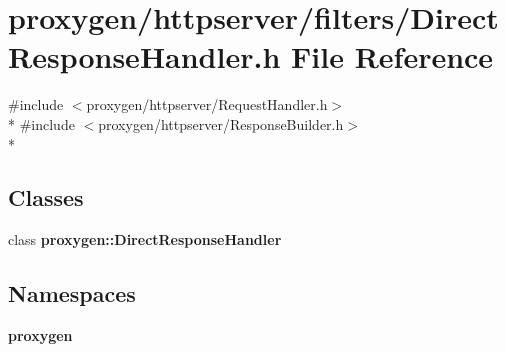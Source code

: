\section{proxygen/httpserver/filters/\+Direct\+Response\+Handler.h File Reference}
\label{DirectResponseHandler_8h}
{\ttfamily \#include $<$proxygen/httpserver/\+Request\+Handler.\+h$>$}\\*
{\ttfamily \#include $<$proxygen/httpserver/\+Response\+Builder.\+h$>$}\\*
\subsection*{Classes}
\begin{DoxyCompactItemize}
\item 
class {\bf proxygen\+::\+Direct\+Response\+Handler}
\end{DoxyCompactItemize}
\subsection*{Namespaces}
\begin{DoxyCompactItemize}
\item 
 {\bf proxygen}
\end{DoxyCompactItemize}
